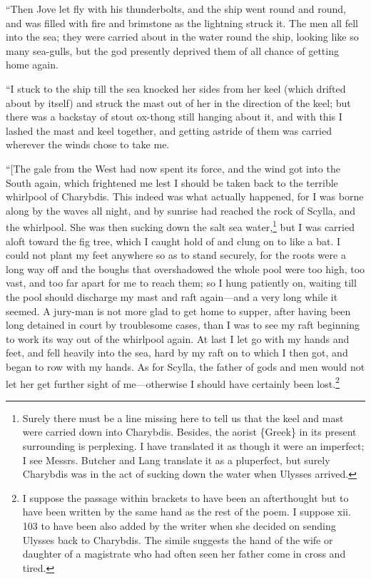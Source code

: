 “Then Jove let fly with his thunderbolts, and the ship went round and round,
and was filled with fire and brimstone as the lightning struck it. The men all
fell into the sea; they were carried about in the water round the ship, looking
like so many sea-gulls, but the god presently deprived them of all chance of
getting home again.

“I stuck to the ship till the sea knocked her sides from her keel (which
drifted about by itself) and struck the mast out of her in the direction of the
keel; but there was a backstay of stout ox-thong still hanging about it, and
with this I lashed the mast and keel together, and getting astride of them was
carried wherever the winds chose to take me.

“[The gale from the West had now spent its force, and the wind got into the
South again, which frightened me lest I should be taken back to the terrible
whirlpool of Charybdis. This indeed was what actually happened, for I was borne
along by the waves all night, and by sunrise had reached the rock of Scylla,
and the whirlpool. She was then sucking down the salt sea water,\footnote{Surely there must be a line missing here to tell us that the keel and mast
were carried down into Charybdis. Besides, the aorist \{Greek\} in its present
surrounding is perplexing. I have translated it as though it were an
imperfect; I see Messrs. Butcher and Lang translate it as a pluperfect, but
surely Charybdis was in the act of sucking down the water when Ulysses
arrived.} but I was
carried aloft toward the fig tree, which I caught hold of and clung on to like
a bat. I could not plant my feet anywhere so as to stand securely, for the
roots were a long way off and the boughs that overshadowed the whole pool were
too high, too vast, and too far apart for me to reach them; so I hung patiently
on, waiting till the pool should discharge my mast and raft again—and a very
long while it seemed. A jury-man is not more glad to get home to supper, after
having been long detained in court by troublesome cases, than I was to see my
raft beginning to work its way out of the whirlpool again. At last I let go
with my hands and feet, and fell heavily into the sea, hard by my raft on to
which I then got, and began to row with my hands. As for Scylla, the father of
gods and men would not let her get further sight of me—otherwise I should have
certainly been lost.\footnote{I suppose the passage within brackets to have been an afterthought but to
have been written by the same hand as the rest of the poem. I suppose xii. 103
to have been also added by the writer when she decided on sending Ulysses back
to Charybdis. The simile suggests the hand of the wife or daughter of a
magistrate who had often seen her father come in cross and tired.}

